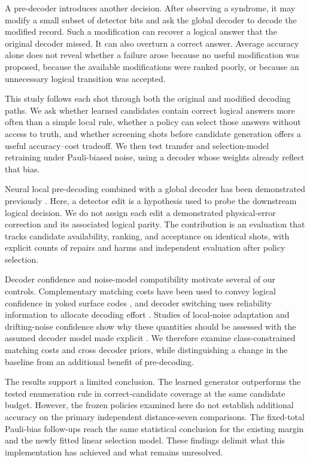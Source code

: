 \documentclass[aps,prd,12pt,twocolumn,superscriptaddress,floatfix]{revtex4-2}
\begin{document}
A pre-decoder introduces another decision. After observing a syndrome, it may modify a small subset of detector bits and ask the global decoder to decode the modified record. Such a modification can recover a logical answer that the original decoder missed. It can also overturn a correct answer. Average accuracy alone does not reveal whether a failure arose because no useful modification was proposed, because the available modifications were ranked poorly, or because an unnecessary logical transition was accepted.

This study follows each shot through both the original and modified decoding paths. We ask whether learned candidates contain correct logical answers more often than a simple local rule, whether a policy can select those answers without access to truth, and whether screening shots before candidate generation offers a useful accuracy--cost tradeoff. We then test transfer and selection-model retraining under Pauli-biased noise, using a decoder whose weights already reflect that bias.

Neural local pre-decoding combined with a global decoder has been demonstrated previously \cite{chamberland2026}. Here, a detector edit is a hypothesis used to probe the downstream logical decision. We do not assign each edit a demonstrated physical-error correction and its associated logical parity. The contribution is an evaluation that tracks candidate availability, ranking, and acceptance on identical shots, with explicit counts of repairs and harms and independent evaluation after policy selection.

Decoder confidence and noise-model compatibility motivate several of our controls. Complementary matching costs have been used to convey logical confidence in yoked surface codes \cite{yoked2025}, and decoder switching uses reliability information to allocate decoding effort \cite{toshio2025}. Studies of local-noise adaptation and drifting-noise confidence show why these quantities should be assessed with the assumed decoder model made explicit \cite{darmawan2024,hoyt2026}. We therefore examine class-constrained matching costs and cross decoder priors, while distinguishing a change in the baseline from an additional benefit of pre-decoding.

The results support a limited conclusion. The learned generator outperforms the tested enumeration rule in correct-candidate coverage at the same candidate budget. However, the frozen policies examined here do not establish additional accuracy on the primary independent distance-seven comparisons. The fixed-total Pauli-bias follow-ups reach the same statistical conclusion for the existing margin and the newly fitted linear selection model. These findings delimit what this implementation has achieved and what remains unresolved.
\end{document}
